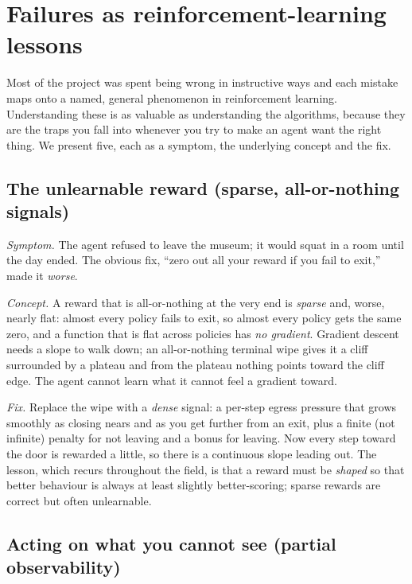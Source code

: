 \documentclass[11pt]{article}
\newcommand{\key}[1]{\textit{#1}}            %
\begin{document}
\section{Failures as reinforcement-learning lessons}

Most of the project was spent being wrong in instructive ways and each mistake maps onto a
named, general phenomenon in reinforcement learning. Understanding these is as valuable as
understanding the algorithms, because they are the traps you fall into whenever you try to
make an agent want the right thing. We present five, each as a symptom, the underlying
concept and the fix.

\subsection{The unlearnable reward (sparse, all-or-nothing signals)}

\emph{Symptom.} The agent refused to leave the museum; it would squat in a room until the
day ended. The obvious fix, ``zero out all your reward if you fail to exit,'' made it
\emph{worse}.

\emph{Concept.} A reward that is all-or-nothing at the very end is \key{sparse} and, worse,
nearly flat: almost every policy fails to exit, so almost every policy gets the same zero,
and a function that is flat across policies has \emph{no gradient}. Gradient descent needs a
slope to walk down; an all-or-nothing terminal wipe gives it a cliff surrounded by a
plateau and from the plateau nothing points toward the cliff edge. The agent cannot learn
what it cannot feel a gradient toward.

\emph{Fix.} Replace the wipe with a \key{dense} signal: a per-step egress pressure that grows
smoothly as closing nears and as you get further from an exit, plus a finite (not infinite)
penalty for not leaving and a bonus for leaving. Now every step toward the door is rewarded a
little, so there is a continuous slope leading out. The lesson, which recurs throughout the
field, is that a reward must be \emph{shaped} so that better behaviour is always at least
slightly better-scoring; sparse rewards are correct but often unlearnable.

\subsection{Acting on what you cannot see (partial observability)}
\end{document}
